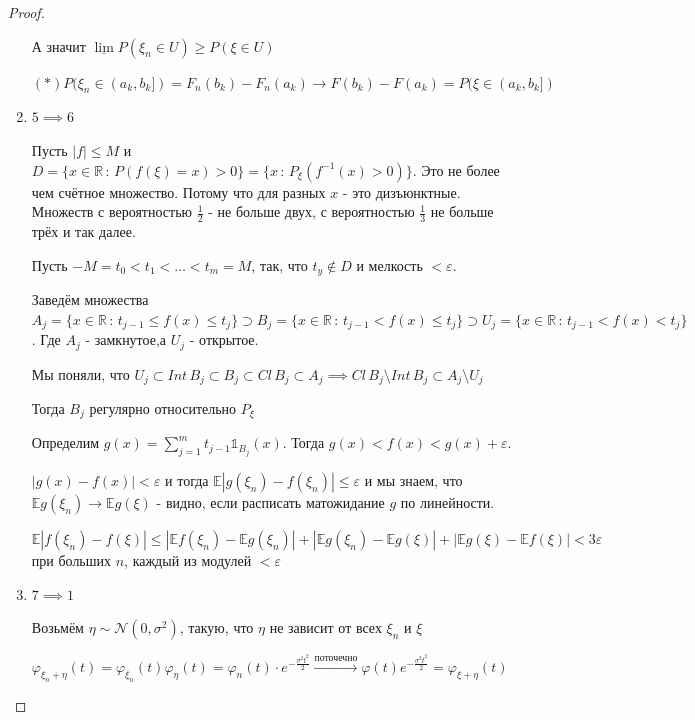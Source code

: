 \begin{proof}
\begin{enumerate}
{            А значит $\underline{\lim} P(\xi_n \in U) \geqslant P(\xi \in U)$

            $(*) P(\xi_n \in (a_k, b_k]) = F_n (b_k) - F_n (a_k) \rightarrow F(b_k) - F(a_k) = P(\xi \in (a_k, b_k])$
        }
        \item {
            $5 \implies 6$

            Пусть $|f| \leqslant M$ и $D = \{ x \in \mathbb{R} \, : \, P(f(\xi) = x) > 0 \} = \{ x \, : \, P_{\xi} (f^{-1} (x) > 0) \}$. Это не более чем счётное множество. Потому что для разных $x$ - это дизъюнктные.
            Множеств с вероятностью $\frac{1}{2}$ - не больше двух, с вероятностью $\frac{1}{3}$ не больше трёх и так далее.

            Пусть $-M = t_0 < t_1 < \ldots < t_m = M$, так, что $t_y \not \in D$ и мелкость $< \varepsilon$.

            Заведём множества $A_j = \{ x \in \mathbb{R} \, : \, t_{j - 1} \leqslant f(x) \leqslant t_j \} \supset B_j = \{ x \in \mathbb{R} \, : \, t_{j - 1} < f(x) \leqslant t_j \} \supset U_j = \{ x \in \mathbb{R} \, : \, t_{j - 1} < f(x) < t_j \}$. Где $A_j$ - замкнутое,а $U_j$ - открытое.

            Мы поняли, что $U_j \subset Int \, B_j \subset B_j \subset Cl \, B_j \subset A_j \implies Cl \, B_j \setminus Int \, B_j \subset A_j \setminus U_j$

            Тогда $B_j$ регулярно относительно $P_\xi$

            Определим $g(x) = \sum_{j = 1}^{m} t_{j - 1} \mathds{1}_{B_j} (x)$. Тогда $g(x) < f(x) < g(x) + \varepsilon$.

            $|g(x) - f(x)| < \varepsilon$ и тогда $\mathbb{E} |g(\xi_n) - f(\xi_n)| \leqslant \varepsilon$ и мы знаем, что $\mathbb{E}g(\xi_n) \rightarrow \mathbb{E}g(\xi)$ - видно, если расписать матожидание $g$ по линейности.

            $\mathbb{E} |f(\xi_n) - f(\xi)| \leqslant |\mathbb{E} f(\xi_n) - \mathbb{E} g(\xi_n)| + |\mathbb{E} g(\xi_n) - \mathbb{E} g(\xi)| + |\mathbb{E} g(\xi) - \mathbb{E} f(\xi) | < 3\varepsilon$ при больших $n$, каждый из модулей $< \varepsilon$
        }
        \item {
            $7 \implies 1$

            Возьмём $\eta \sim \mathcal{N} (0, \sigma^2)$, такую, что $\eta$ не зависит от всех $\xi_n$ и $\xi$

            $\varphi_{\xi_n + \eta} (t) = \varphi_{\xi_n} (t) \varphi_{\eta} (t) = \varphi_{n} (t) \cdot e^{-\frac{\sigma^2 t^2}{2}} \overset{\text{поточечно}}{\rightarrow} \varphi(t) e^{-\frac{\sigma^2t^2}{2}} = \varphi_{\xi + \eta} (t)$

}
\end{enumerate}
\end{proof}
